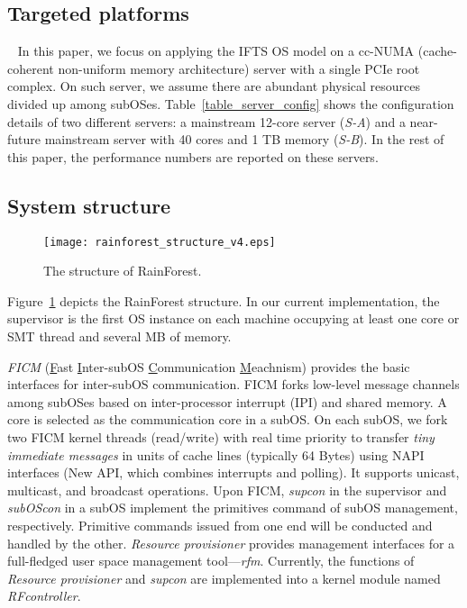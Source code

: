 \documentclass[pageno]{jpaper}
\begin{document}
\subsection{Targeted platforms}~\label{section_hardware_platform}
In this paper, we focus on applying the IFTS OS model on a cc-NUMA (cache-coherent non-uniform memory architecture) server with a single PCIe root complex. On such server, we assume there are abundant physical resources divided up among subOSes. Table~\ref{table_server_config} shows the configuration details of two different servers: a mainstream 12-core server (\emph{S-A}) and a near-future mainstream server with 40 cores and 1 TB memory (\emph{S-B}). In the rest of this paper, the performance numbers are reported on these servers.





\subsection{System structure}\label{section_system_structure}



\begin{figure}[t]
\setlength{\abovecaptionskip}{3pt}
\setlength{\belowcaptionskip}{0pt}
  \centering
  \texttt{[image: rainforest\_structure\_v4.eps]}
  \caption{The structure of RainForest.}
  \label{architecture}
\end{figure}


Figure~\ref{architecture} depicts the RainForest structure. In our current implementation, the supervisor is the first  OS instance on each machine occupying at least one core or SMT thread and several MB of memory. 

\emph{FICM} (\underline{F}ast \underline{I}nter-subOS \underline{C}ommunication \underline{M}eachnism) provides the basic interfaces for inter-subOS communication. FICM forks low-level message channels among subOSes based on inter-processor interrupt (IPI) and shared memory. A core is selected as the communication core in a subOS. On each subOS, we fork two FICM kernel threads (read/write) with real time priority to transfer \emph{tiny immediate messages} in units of cache lines (typically 64 Bytes) using NAPI  interfaces (New API, which combines interrupts and polling). It supports unicast, multicast, and broadcast operations. Upon FICM, \emph{supcon} in the supervisor and \emph{subOScon} in a subOS implement the primitives command of subOS management, respectively. Primitive commands issued from one end will be conducted and handled by the other. \emph{Resource provisioner} provides management interfaces for a full-fledged user space management tool---\emph{rfm}. Currently, the functions of \emph{Resource provisioner} and \emph{supcon} are implemented into a kernel module named \emph{RFcontroller}.
\end{document}
